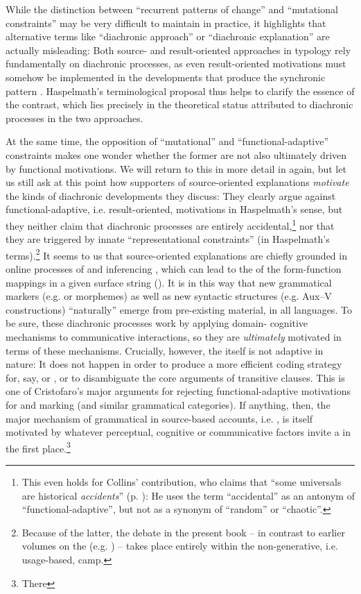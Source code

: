 \documentclass[output=paper]{langsci/langscibook}
\begin{document}
While the distinction between “recurrent patterns of change” and “mutational constraints” may be very difficult to maintain in practice, it highlights that alternative terms like “diachronic approach” or “diachronic explanation” are actually misleading: Both source- and result-oriented approaches in typology rely fundamentally on diachronic processes, as even result-oriented motivations must somehow be implemented in the developments that produce the synchronic pattern \citep{Haspelmath1999_Opt}. Haspelmath’s terminological proposal thus helps to clarify the essence of the contrast, which lies precisely in the theoretical status attributed to diachronic processes in the two approaches. 

At the same time, the opposition of “mutational” and “functional-adaptive” constraints makes one wonder whether the former are not also ultimately driven by functional motivations. We will return to this  in more detail in  again, but let us still ask at this point how supporters of source-oriented explanations \textit{motivate} the kinds of diachronic developments they discuss: They clearly argue against functional-adaptive, i.e. result-oriented, motivations in Haspelmath’s sense, but they neither claim that diachronic processes are entirely accidental\largerpage,\footnote{This even holds for Collins’ contribution, who claims that “some universals are historical \textit{accidents}” (p. \pageref{p:collins:historicalaccidents}): He uses the term “accidental” as an antonym of “functional-adaptive”, but not as a synonym of “random” or “chaotic”.} nor that they are triggered by innate “representational constraints” (in Haspelmath’s terms).\footnote{Because of the latter, the debate in the present book – in contrast to earlier volumes on the  (e.g. \citealt{Hawkins1988_ExplEd,Good2008_Change}) – takes place entirely within the non-generative, i.e. usage-based, camp.} It seems to us that source-oriented explanations are chiefly groun\-ded in online processes of  and inferencing \citep{Bybee2010}, which can lead to the  of the form-function mappings in a given surface string (\citealt{Croft2000,DeSmet2009}). It is in this way that new grammatical markers (e.g.  or  morphemes) as well as new syntactic structures (e.g. Aux–V constructions) “naturally” emerge from pre-existing material, in all languages. To be sure, these diachronic processes work by applying domain- cognitive mechanisms to communicative interactions, so they are \textit{ultimately} motivated in terms of these mechanisms. Crucially, however, the  itself is not adaptive in nature: It does not happen in order to produce a more efficient coding strategy for, say,  or , or to disambiguate the core arguments of transitive clauses. This is one of Cristofaro’s major arguments for rejecting functional-adaptive motivations for  and  marking (and similar grammatical categories). If anything, then, the major mechanism of grammatical  in source-based accounts, i.e. , is itself motivated by whatever perceptual, cognitive or communicative factors invite a  in the first place.\footnote{There 
}
\end{document}
